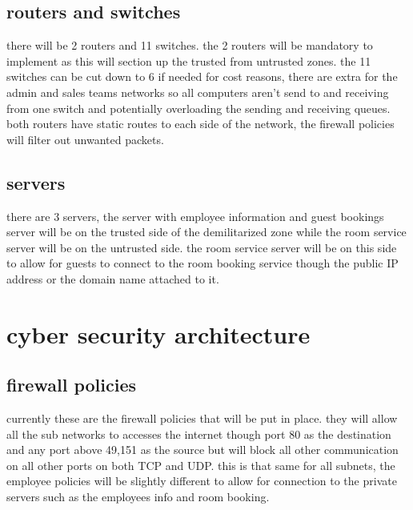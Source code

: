 \documentclass[11pt]{article}
\begin{document}
\subsection{routers and switches}
there will be 2 routers and 11 switches. the 2 routers will be mandatory to implement as this will section up the trusted from untrusted zones. the 11 switches can be cut down to 6 if needed for cost reasons, there are extra for the admin and sales teams networks so all computers aren't send to and receiving from one switch and potentially overloading the sending and receiving queues. both routers have static routes to each side of the network, the firewall policies will filter out unwanted packets.

\subsection{servers}
there are 3 servers, the server with employee information and guest bookings server will be on the trusted side of the demilitarized zone while the room service server will be on the untrusted side. the room service server will be on this side to allow for guests to connect to the room booking service though the public IP address or the domain name attached to it.

\section{cyber security architecture}
\subsection{firewall policies}
currently these are the firewall policies that will be put in place. they will allow all the sub networks to accesses the internet though port 80 as the destination and any port above 49,151 as the source but will block all other communication on all other ports on both TCP and UDP. this is that same for all subnets, the employee policies will be slightly different to allow for connection to the private servers such as the employees info and room booking.
\end{document}
